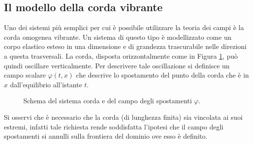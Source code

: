 \subsection{Il modello della corda vibrante}
Uno dei sistemi più semplici per cui è possibile utilizzare la teoria dei campi è la corda omogenea vibrante. Un sistema di questo tipo è modellizzato come un corpo elastico esteso in una dimensione e di grandezza trascurabile nelle direzioni a questa trasversali. La corda, disposta orizzontalmente come in Figura \ref{fig:corda}, può quindi oscillare verticalmente. Per descrivere tale oscillazione si definisce un campo scalare $\varphi(t,x)$ che descrive lo spostamento del punto della corda che è in $x$ dall'equilibrio all'istante $t$.
\begin{figure}[H]
    \centering
    \caption{Schema del sistema corda e del campo degli spostamenti $\varphi$.}
    \label{fig:corda}
\end{figure} 
Si osservi che è necessario che la corda (di lunghezza finita) sia vincolata ai suoi estremi, infatti tale richiesta rende soddisfatta l'ipotesi che il campo degli spostamenti si annulli sulla frontiera del dominio ove esso è definito. \\


